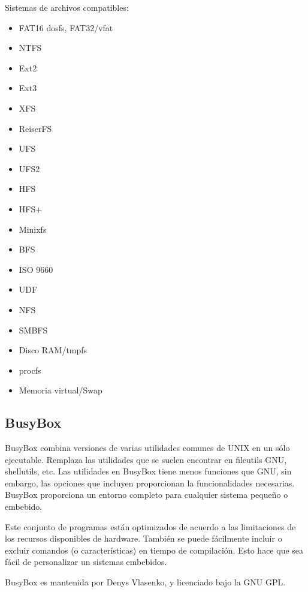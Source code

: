 Sistemas de archivos compatibles:


			\begin{itemize}
				\item FAT16 dosfs, FAT32/vfat	
				\item NTFS	
				\item Ext2	
				\item Ext3	
				\item XFS	
				\item ReiserFS	
				\item UFS	
				\item UFS2	
				\item HFS
				\item HFS+	
				\item Minixfs	
				\item BFS	
				\item ISO 9660	 
				\item UDF	
				\item NFS	
				\item SMBFS	
				\item Disco RAM/tmpfs	
				\item procfs	
				\item Memoria virtual/Swap	
				
			\end{itemize}


		\subsection{ BusyBox}	
 	
				
			 
BusyBox \cite{Etiqueta36} combina versiones de varias utilidades comunes de UNIX en un sólo ejecutable. Remplaza las utilidades que se suelen encontrar en fileutils GNU, shellutils, etc. Las utilidades en BusyBox tiene menos funciones que GNU, sin embargo, las opciones que incluyen proporcionan la funcionalidades necesarias. BusyBox proporciona un entorno  completo para cualquier sistema pequeño o embebido.

Este conjunto de programas están optimizados de acuerdo a las limitaciones de los recursos disponibles de hardware. También se puede fácilmente incluir o excluir comandos (o características) en tiempo de compilación. Esto hace que sea fácil de personalizar un sistemas embebidos. 


BusyBox es mantenida por Denys Vlasenko, y licenciado bajo la GNU GPL.


			
 			
 